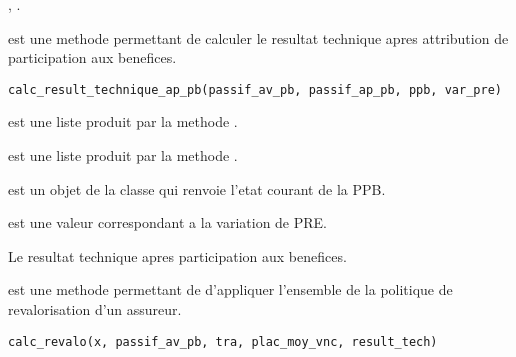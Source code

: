 \documentclass[a4paper]{book}
\begin{document}
%
\begin{SeeAlso}\relax
{}, .
\end{SeeAlso}
%
\begin{Description}\relax
{} est une methode permettant de calculer le resultat technique
apres attribution de participation aux benefices.
\end{Description}
%
\begin{Usage}
\begin{verbatim}
calc_result_technique_ap_pb(passif_av_pb, passif_ap_pb, ppb, var_pre)
\end{verbatim}
\end{Usage}
%
\begin{Arguments}
\begin{ldescription}
\item[\code{passif\_av\_pb}] est une liste produit par la methode .

\item[\code{passif\_ap\_pb}] est une liste produit par la methode .

\item[\code{ppb}] est un objet de la classe  qui renvoie l'etat courant de la PPB.

\item[\code{var\_pre}] est une valeur  correspondant a la variation de PRE.
\end{ldescription}
\end{Arguments}
%
\begin{Value}
Le resultat technique apres participation aux benefices.
\end{Value}
%
\begin{Description}\relax
{} est une methode permettant de
d'appliquer l'ensemble de la politique de revalorisation d'un assureur.
\end{Description}
%
\begin{Usage}
\begin{verbatim}
calc_revalo(x, passif_av_pb, tra, plac_moy_vnc, result_tech)
\end{verbatim}
\end{Usage}
\end{document}
